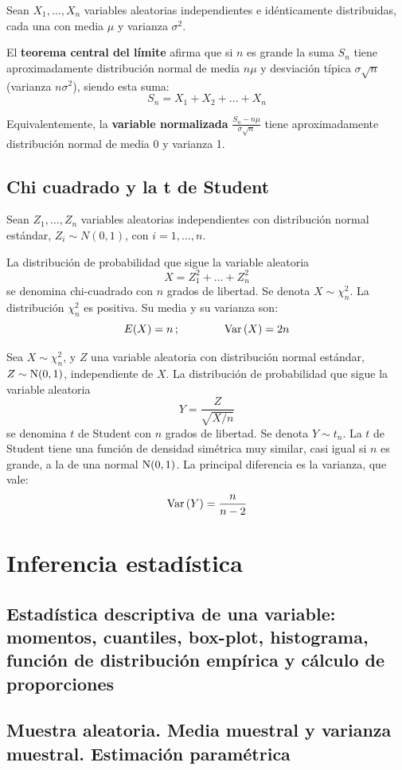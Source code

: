 \documentclass[a4paper]{book}
\begin{document}
Sean $X_1,\dots , X_n$ variables aleatorias independientes e idénticamente distribuidas, cada una con media $\mu$ y varianza $\sigma ^2$.

El \textbf{teorema central del límite} afirma que si $n$ es grande la suma $S_n$ tiene aproximadamente distribución normal de media $n\mu$ y desviación típica $\sigma \sqrt{n}$ (varianza $n\sigma ^2$), siendo esta suma:
\[ S_n = X_1 + X_2 + \dots + X_n \]

Equivalentemente, la \textbf{variable normalizada} $\frac{S_n-n\mu}{\sigma \sqrt{n}}$ tiene aproximadamente distribución normal de media 0 y varianza 1.

\section{Chi cuadrado y la t de Student}

Sean $Z_1,\dots ,Z_n$ variables aleatorias independientes con distribución normal estándar, $Z_i \sim N \left( 0,1 \right)$, con $i=1,\dots ,n$.

La distribución de probabilidad que sigue la variable aleatoria
\[ X=Z_1^2+\dots +Z_n^2 \]
se denomina chi-cuadrado con $n$ grados de libertad. Se denota $X\sim \chi _n^2$. La distribución $\chi _n^2$ es positiva. Su media y su varianza son:
\[ E (X) = n \, ; \qquad \qquad \operatorname{Var} \left( X \right)=2n \]

Sea $X\sim \chi _n^2$, y $Z$ una variable aleatoria con distribución normal estándar, $Z\sim \operatorname{N}(0,1)$, independiente de $X$. La distribución de probabilidad que sigue la variable aleatoria
\[Y=\frac{Z}{\sqrt{X/n}}\]
se denomina $t$ de Student con $n$ grados de libertad. Se denota $Y\sim t_n$. La $t$ de Student tiene una función de densidad simétrica muy similar, casi igual si $n$ es grande, a la de una normal $\operatorname{N}(0,1)$. La principal diferencia es la varianza, que vale:
\[ \operatorname{Var} \left( Y \right)=\frac{n}{n-2}  \]

\chapter{Inferencia estadística}

\section{Estadística descriptiva de una variable: momentos, cuantiles, box-plot, histograma, función de distribución empírica y cálculo de proporciones}
\section{Muestra aleatoria. Media muestral y varianza muestral. Estimación paramétrica}
\end{document}
